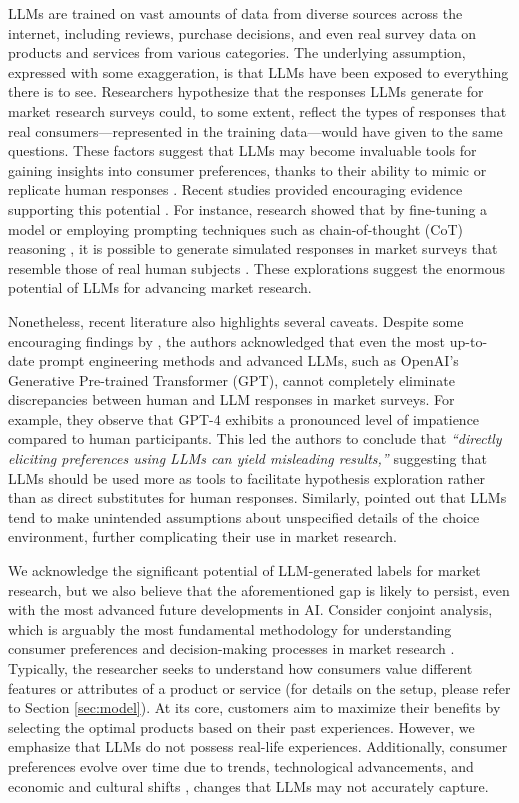 LLMs are trained on vast amounts of data from diverse sources across the internet, including reviews, purchase decisions, and even real survey data on products and services from various categories. The underlying assumption, expressed with some exaggeration, is that LLMs have been exposed to everything there is to see. Researchers hypothesize that the responses LLMs generate for market research surveys could, to some extent, reflect the types of responses that real consumers---represented in the training data---would have given to the same questions. These factors suggest that LLMs may become invaluable tools for gaining insights into consumer preferences, thanks to their ability to mimic or replicate human responses \citep{brand2023using}.
Recent studies provided encouraging evidence supporting this potential \citep{argyle2023out,chen2023emergence,horton2023large}. For instance, research showed that by fine-tuning a model \citep{gururangan2020don} or employing prompting techniques such as chain-of-thought (CoT) reasoning \citep{wei2022chain}, it is possible to generate simulated responses in market surveys that resemble those of real human subjects \citep{brand2023using,goli2024frontiers}. These explorations suggest the enormous potential of LLMs for advancing market research.

Nonetheless, recent literature also highlights several caveats. Despite some encouraging findings by \cite{goli2024frontiers}, the authors acknowledged that even the most up-to-date prompt engineering methods and advanced LLMs, such as OpenAI's Generative Pre-trained Transformer (GPT), cannot completely eliminate discrepancies between human and LLM responses in market surveys. For example, they observe that GPT-4 exhibits a pronounced level of impatience compared to human participants. This led the authors to conclude that \textit{``directly eliciting preferences using LLMs can yield misleading results,''} suggesting that LLMs should be used more as tools to facilitate hypothesis exploration rather than as direct substitutes for human responses. Similarly, \cite{gui2023challenge} pointed out that LLMs tend to make unintended assumptions about unspecified details of the choice environment, further complicating their use in market research.

We acknowledge the significant potential of LLM-generated labels for market research, but we also believe that the aforementioned gap is likely to persist, even with the most advanced future developments in AI. Consider conjoint analysis, which is arguably the most fundamental methodology for understanding consumer preferences and decision-making processes in market research \citep{green1990conjoint}. Typically, the researcher seeks to understand how consumers value different features or attributes of a product or service (for details on the setup, please refer to Section \ref{sec:model}).
At its core, customers aim to maximize their benefits by selecting the optimal products based on their past experiences. However, we emphasize that LLMs do not possess real-life experiences. Additionally, consumer preferences evolve over time due to trends, technological advancements, and economic and cultural shifts \citep{solomon2020consumer}, changes that LLMs may not accurately capture.

